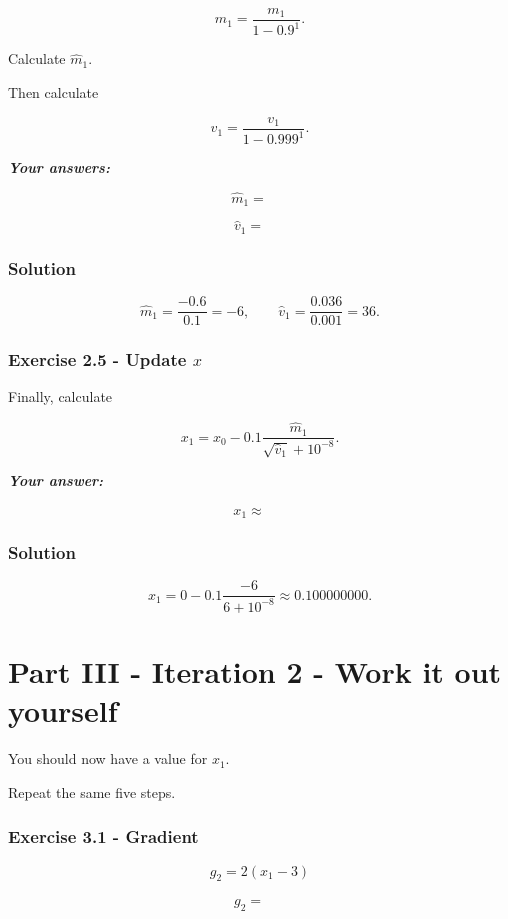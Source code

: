 \documentclass[10pt]{article}
\begin{document}
\[
\hat m_1 =
\frac{m_1}{1-0.9^1}.
\]

Calculate $\hat m_1$.

Then calculate

\[
\hat v_1 =
\frac{v_1}{1-0.999^1}.
\]

\textbf{\textit{Your answers:}}

\[
\hat m_1 = {\phantom{000}}
\]

\[
\hat v_1 = {\phantom{000}}
\]

\begingroup\color{red}

\subsubsection*{Solution}
\[
\hat m_1=\frac{-0.6}{0.1}=-6,\qquad\hat v_1=\frac{0.036}{0.001}=36.
\]

\par\endgroup

\subsubsection*{Exercise 2.5 - Update $x$}
Finally, calculate

\[
x_1 =
x_0 -
0.1
\frac{\hat m_1}
{\sqrt{\hat v_1}+10^{-8}}.
\]

\textbf{\textit{Your answer:}}

\[
x_1 \approx {\phantom{000}}
\]

\begingroup\color{red}

\subsubsection*{Solution}
\[
x_1=0-0.1\frac{-6}{6+10^{-8}}\approx0.100000000.
\]

\par\endgroup

\clearpage
\section*{Part III - Iteration 2 - Work it out yourself}
You should now have a value for $x_1$.

Repeat the same five steps.

\subsubsection*{Exercise 3.1 - Gradient}
\[
g_2 = 2(x_1-3)
\]

\[
g_2 = {\phantom{000}}
\]
\end{document}
